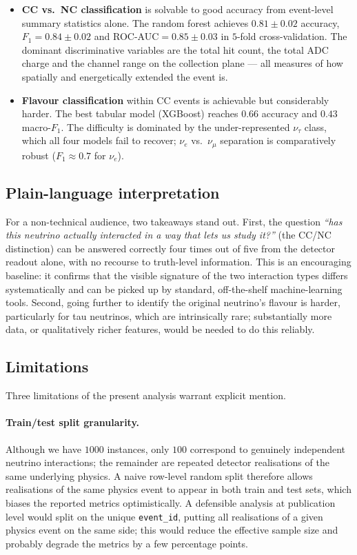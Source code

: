 \documentclass[11pt,a4paper]{article}
\begin{document}
\begin{itemize}[leftmargin=*]
\item \textbf{CC vs.\ NC classification} is solvable to good accuracy from event-level summary statistics alone.  The random forest achieves $0.81\pm0.02$ accuracy, $F_1=0.84\pm0.02$ and ROC-AUC$=0.85\pm0.03$ in $5$-fold cross-validation.  The dominant discriminative variables are the total hit count, the total ADC charge and the channel range on the collection plane --- all measures of how spatially and energetically extended the event is.
\item \textbf{Flavour classification} within CC events is achievable but considerably harder.  The best tabular model (XGBoost) reaches $0.66$ accuracy and $0.43$ macro-$F_1$.  The difficulty is dominated by the under-represented $\nu_\tau$ class, which all four models fail to recover; $\nu_e$ vs.\ $\nu_\mu$ separation is comparatively robust ($F_1\approx0.7$ for $\nu_e$).
\end{itemize}

\subsection{Plain-language interpretation}
For a non-technical audience, two takeaways stand out.  First, the question \emph{``has this neutrino actually interacted in a way that lets us study it?''} (the CC/NC distinction) can be answered correctly four times out of five from the detector readout alone, with no recourse to truth-level information.  This is an encouraging baseline: it confirms that the visible signature of the two interaction types differs systematically and can be picked up by standard, off-the-shelf machine-learning tools.  Second, going further to identify the original neutrino's flavour is harder, particularly for tau neutrinos, which are intrinsically rare; substantially more data, or qualitatively richer features, would be needed to do this reliably.

\subsection{Limitations}
Three limitations of the present analysis warrant explicit mention.

\paragraph{Train/test split granularity.}
Although we have $\num{1000}$ instances, only $\num{100}$ correspond to genuinely independent neutrino interactions; the remainder are repeated detector realisations of the same underlying physics.  A naive row-level random split therefore allows realisations of the same physics event to appear in both train and test sets, which biases the reported metrics optimistically.  A defensible analysis at publication level would split on the unique \texttt{event\_id}, putting all realisations of a given physics event on the same side; this would reduce the effective sample size and probably degrade the metrics by a few percentage points.
\end{document}
